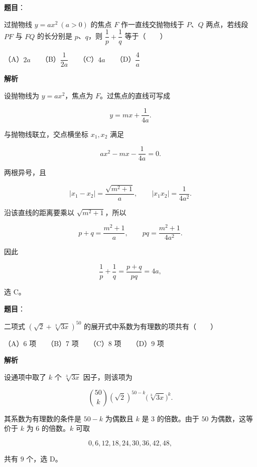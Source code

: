 \begin{answer}

\textbf{题目}：

过抛物线 $y=ax^2\ (a>0)$ 的焦点 $F$ 作一直线交抛物线于 $P$、$Q$ 两点，若线段 $PF$ 与 $FQ$ 的长分别是 $p$、$q$，则 $\dfrac1p+\dfrac1q$ 等于\mbox{（　　）}

（A）$2a$　　（B）$\dfrac1{2a}$　　（C）$4a$　　（D）$\dfrac4a$

\textbf{解析}

设抛物线为 $y=ax^2$，焦点为 $F$。过焦点的直线可写成

\nopagebreak[4]
\[
y=mx+\frac1{4a}.
\]

与抛物线联立，交点横坐标 $x_1,x_2$ 满足

\nopagebreak[4]
\[
ax^2-mx-\frac1{4a}=0.
\]

两根异号，且

\nopagebreak[4]
\[
|x_1-x_2|=\frac{\sqrt{m^2+1}}a,
\qquad |x_1x_2|=\frac1{4a^2}.
\]

沿该直线的距离要乘以 $\sqrt{m^2+1}$，所以

\nopagebreak[4]
\[
p+q=\frac{m^2+1}{a},
\qquad pq=\frac{m^2+1}{4a^2}.
\]

因此

\nopagebreak[4]
\[
\frac1p+\frac1q=\frac{p+q}{pq}=4a,
\]

选 C。


\end{answer}
\begin{answer}

\textbf{题目}：

二项式 $\left(\sqrt2+\sqrt[3]{3x}\right)^{50}$ 的展开式中系数为有理数的项共有\mbox{（　　）}

（A）6 项　　（B）7 项　　（C）8 项　　（D）9 项

\textbf{解析}

设通项中取了 $k$ 个 $\sqrt[3]{3x}$ 因子，则该项为

\nopagebreak[4]
\[
\binom{50}{k}(\sqrt2)^{50-k}\bigl(\sqrt[3]{3x}\bigr)^k.
\]

其系数为有理数的条件是 $50-k$ 为偶数且 $k$ 是 $3$ 的倍数。由于 $50$ 为偶数，这等价于 $k$ 为 $6$ 的倍数。$k$ 可取

\nopagebreak[4]
\[
0,6,12,18,24,30,36,42,48,
\]

共有 $9$ 个，选 D。


\end{answer}

